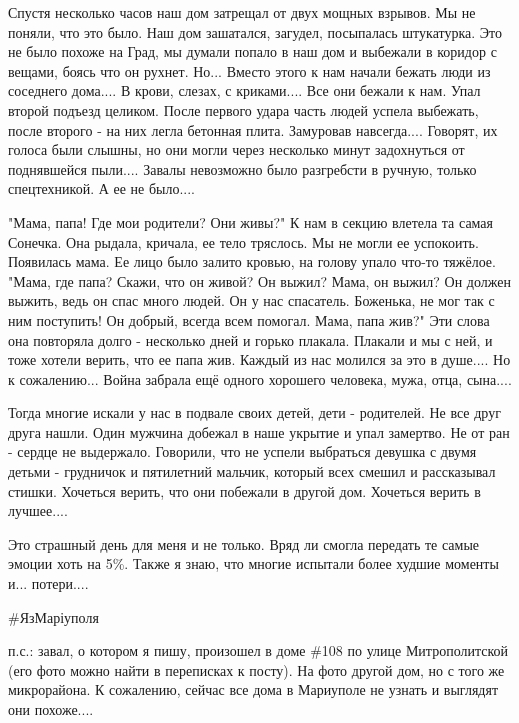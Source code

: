 Спустя несколько часов наш дом затрещал от двух мощных взрывов. Мы не поняли,
что это было. Наш дом зашатался, загудел, посыпалась штукатурка. Это не было
похоже на Град, мы думали попало в наш дом и выбежали в коридор с вещами, боясь
что он рухнет. Но... Вместо этого к нам начали бежать люди из соседнего
дома.... В крови, слезах, с криками.... Все они бежали к нам. Упал второй
подъезд целиком. После первого удара часть людей успела выбежать, после второго
- на них легла бетонная плита. Замуровав навсегда.... Говорят, их голоса были
слышны, но они могли через несколько минут задохнуться от поднявшейся пыли....
Завалы невозможно было разгребсти в ручную, только спецтехникой. А ее не
было....

"Мама, папа! Где мои родители? Они живы?" К нам в секцию влетела та самая
Сонечка. Она рыдала, кричала, ее тело тряслось. Мы не могли ее успокоить.
Появилась мама. Ее лицо было залито кровью, на голову упало что-то тяжёлое.
"Мама, где папа? Скажи, что он живой? Он выжил? Мама, он выжил? Он должен
выжить, ведь он спас много людей. Он у нас спасатель. Боженька, не мог так с
ним поступить! Он добрый, всегда всем помогал. Мама, папа жив?" Эти слова она
повторяла долго - несколько дней и горько плакала. Плакали и мы с ней,  и тоже
хотели верить, что ее папа жив. Каждый из нас молился за это в душе.... Но к
сожалению... Война забрала ещё одного хорошего человека, мужа, отца, сына....

Тогда многие искали у нас в подвале своих детей, дети - родителей. Не все друг
друга нашли. Один мужчина добежал в наше укрытие и упал замертво. Не от ран -
сердце не выдержало. Говорили, что не успели выбраться девушка с двумя детьми -
грудничок и пятилетний мальчик, который всех смешил и рассказывал стишки.
Хочеться верить, что они побежали в другой дом. Хочеться верить в лучшее....

Это страшный день для меня и не только.   Вряд ли смогла передать те самые
эмоции хоть на 5\%. Также я знаю, что многие испытали более худшие моменты и...
потери....

\#ЯзМаріуполя

п.с.: завал, о котором я пишу, произошел в доме \#108 по улице Митрополитской
(его фото можно найти в переписках к посту). На фото другой дом, но с того же
микрорайона. К сожалению, сейчас все дома в Мариуполе не узнать и выглядят они
похоже....

